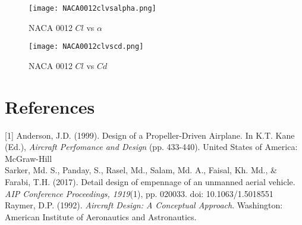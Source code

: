 \documentclass{article}
\begin{document}
\begin{figure}
\begin{center}
	\texttt{[image: NACA0012clvsalpha.png]}
	\caption{NACA 0012 $Cl$ vs $\alpha$}
	\label{Figure 1:}

\end{center}
\end{figure}

\begin{figure}
\begin{center}
	\texttt{[image: NACA0012clvscd.png]}
	\caption{NACA 0012 $Cl$ vs $Cd$}
	\label{Figure 1:}

\end{center}
\end{figure}

\section*{References}

[1] Anderson, J.D. (1999). Design of a Propeller-Driven Airplane. In K.T. Kane (Ed.), \textit{Aircraft Perfomance and Design} (pp. 433-440). United States of America: McGraw-Hill \\

\noindent [2] Sarker, Md. S., Panday, S., Rasel, Md., Salam, Md. A., Faisal, Kh. Md., \&  Farabi, T.H. (2017). Detail design of empennage of an unmanned aerial vehicle. \textit{AIP Conference Proceedings, 1919}(1), pp. 020033. doi: 10.1063/1.5018551\\

\noindent [3] Raymer, D.P. (1992). \textit{Aircraft Design: A Conceptual Approach}. Washington: American Institute of Aeronautics and Astronautics.
\end{document}
